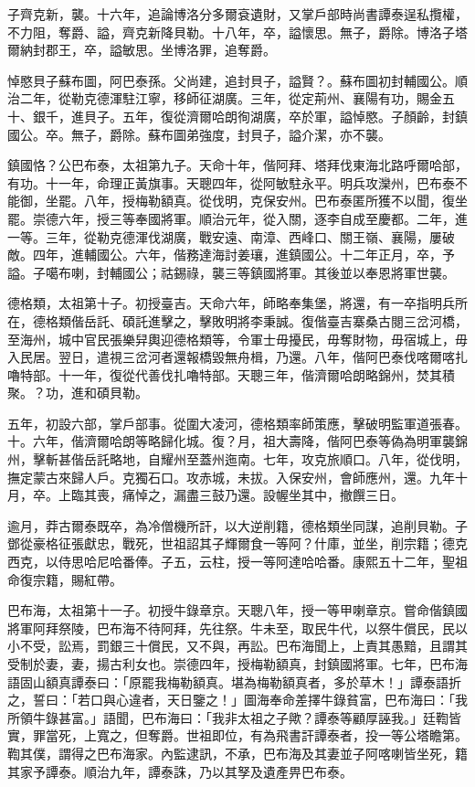 \begin{pinyinscope}
子齊克新，襲。十六年，追論博洛分多爾袞遺財，又掌戶部時尚書譚泰逞私攬權，不力阻，奪爵、謚，齊克新降貝勒。十八年，卒，謚懷思。無子，爵除。博洛子塔爾納封郡王，卒，謚敏思。坐博洛罪，追奪爵。

悼愍貝子蘇布圖，阿巴泰孫。父尚建，追封貝子，謚賢？。蘇布圖初封輔國公。順治二年，從勒克德渾駐江寧，移師征湖廣。三年，從定荊州、襄陽有功，賜金五十、銀千，進貝子。五年，復從濟爾哈朗徇湖廣，卒於軍，謚悼愍。子顏齡，封鎮國公。卒。無子，爵除。蘇布圖弟強度，封貝子，謚介潔，亦不襲。

鎮國恪？公巴布泰，太祖第九子。天命十年，偕阿拜、塔拜伐東海北路呼爾哈部，有功。十一年，命理正黃旗事。天聰四年，從阿敏駐永平。明兵攻灤州，巴布泰不能御，坐罷。八年，授梅勒額真。從伐明，克保安州。巴布泰匿所獲不以聞，復坐罷。崇德六年，授三等奉國將軍。順治元年，從入關，逐李自成至慶都。二年，進一等。三年，從勒克德渾伐湖廣，戰安遠、南漳、西峰口、關王嶺、襄陽，屢破敵。四年，進輔國公。六年，偕務達海討姜瓖，進鎮國公。十二年正月，卒，予謚。子噶布喇，封輔國公；祜錫祿，襲三等鎮國將軍。其後並以奉恩將軍世襲。

德格類，太祖第十子。初授臺吉。天命六年，師略奉集堡，將還，有一卒指明兵所在，德格類偕岳託、碩託進擊之，擊敗明將李秉誠。復偕臺吉寨桑古閱三岔河橋，至海州，城中官民張樂舁輿迎德格類等，令軍士毋擾民，毋奪財物，毋宿城上，毋入民居。翌日，遣視三岔河者還報橋毀無舟楫，乃還。八年，偕阿巴泰伐喀爾喀扎嚕特部。十一年，復從代善伐扎嚕特部。天聰三年，偕濟爾哈朗略錦州，焚其積聚。？功，進和碩貝勒。

五年，初設六部，掌戶部事。從圍大凌河，德格類率師策應，擊破明監軍道張春。十。六年，偕濟爾哈朗等略歸化城。復？月，祖大壽降，偕阿巴泰等偽為明軍襲錦州，擊斬甚偕岳託略地，自耀州至蓋州迤南。七年，攻克旅順口。八年，從伐明，撫定蒙古來歸人戶。克獨石口。攻赤城，未拔。入保安州，會師應州，還。九年十月，卒。上臨其喪，痛悼之，漏盡三鼓乃還。設幄坐其中，撤饌三日。

逾月，莽古爾泰既卒，為冷僧機所訐，以大逆削籍，德格類坐同謀，追削貝勒。子鄧從豪格征張獻忠，戰死，世祖詔其子輝爾食一等阿？什庫，並坐，削宗籍；德克西克，以侍思哈尼哈番俸。子五，云柱，授一等阿達哈哈番。康熙五十二年，聖祖命復宗籍，賜紅帶。

巴布海，太祖第十一子。初授牛錄章京。天聰八年，授一等甲喇章京。嘗命偕鎮國將軍阿拜祭陵，巴布海不待阿拜，先往祭。牛未至，取民牛代，以祭牛償民，民以小不受，訟焉，罰銀三十償民，又不與，再訟。巴布海聞上，上責其愚黯，且謂其受制於妻，妻，揚古利女也。崇德四年，授梅勒額真，封鎮國將軍。七年，巴布海語固山額真譚泰曰：「原罷我梅勒額真。堪為梅勒額真者，多於草木！」譚泰語折之，誓曰：「若口與心違者，天日鑒之！」圖海奉命差擇牛錄貧富，巴布海曰：「我所領牛錄甚富。」語聞，巴布海曰：「我非太祖之子歟？譚泰等顧厚誣我。」廷鞫皆實，罪當死，上寬之，但奪爵。世祖即位，有為飛書訐譚泰者，投一等公塔瞻第。鞫其僕，謂得之巴布海家。內監逮訊，不承，巴布海及其妻並子阿喀喇皆坐死，籍其家予譚泰。順治九年，譚泰誅，乃以其孥及遺產畀巴布泰。


\end{pinyinscope}

